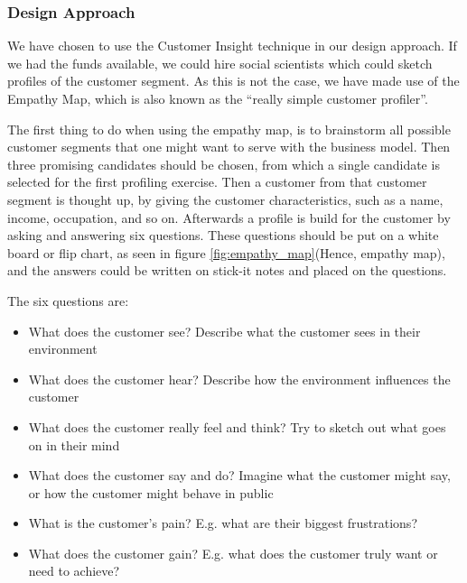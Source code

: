 \subsubsection{Design Approach}
We have chosen to use the Customer Insight\cite{127} technique in our design approach. If we had the funds available, we could hire social scientists which could sketch profiles of the customer segment. As this is not the case, we have made use of the Empathy Map, which is also known as the ``really simple customer profiler''\cite{131}.

The first thing to do when using the empathy map, is to brainstorm all possible customer segments that one might want to serve with the business model. Then three promising candidates should be chosen, from which a single candidate is selected for the first profiling exercise. Then a customer from that customer segment is thought up, by giving the customer characteristics, such as a name, income, occupation, and so on. Afterwards a profile is build for the customer by asking and answering six questions.
These questions should be put on a white board or flip chart, as seen in figure \ref{fig:empathy_map}(Hence, empathy map), and the answers could be written on stick-it notes and placed on the questions.

The six questions are\cite{131}:
\begin{itemize}
\item What does the customer see? Describe what the customer sees in their environment
\item What does the customer hear? Describe how the environment influences the customer
\item What does the customer really feel and think? Try to sketch out what goes on in their mind
\item What does the customer say and do? Imagine what the customer might say, or how the customer might behave in public
\item What is the customer's pain? E.g. what are their biggest frustrations?
\item What does the customer gain? E.g. what does the customer truly want or need to achieve?
\end{itemize}

